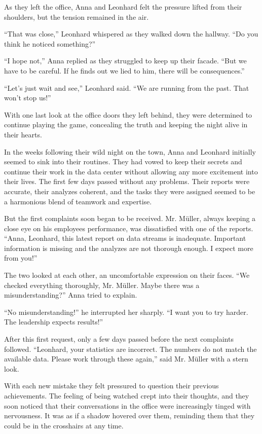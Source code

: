 \documentclass[
]{article}
\begin{document}
As they left the office, Anna and Leonhard felt the pressure lifted from
their shoulders, but the tension remained in the air.

``That was close,'' Leonhard whispered as they walked down the hallway.
``Do you think he noticed something?''

``I hope not,'' Anna replied as they struggled to keep up their facade.
``But we have to be careful. If he finds out we lied to him, there will
be consequences.''

``Let's just wait and see,'' Leonhard said. ``We are running from the
past. That won't stop us!''

With one last look at the office doors they left behind, they were
determined to continue playing the game, concealing the truth and
keeping the night alive in their hearts.

In the weeks following their wild night on the town, Anna and Leonhard
initially seemed to sink into their routines. They had vowed to keep
their secrets and continue their work in the data center without
allowing any more excitement into their lives. The first few days passed
without any problems. Their reports were accurate, their analyzes
coherent, and the tasks they were assigned seemed to be a harmonious
blend of teamwork and expertise.

But the first complaints soon began to be received. Mr. Müller, always
keeping a close eye on his employees\textquotesingle{} performance, was
dissatisfied with one of the reports. ``Anna, Leonhard, this latest
report on data streams is inadequate. Important information is missing
and the analyzes are not thorough enough. I expect more from you!''

The two looked at each other, an uncomfortable expression on their
faces. ``We checked everything thoroughly, Mr. Müller. Maybe there was a
misunderstanding?'' Anna tried to explain.

``No misunderstanding!'' he interrupted her sharply. ``I want you to try
harder. The leadership expects results!''

After this first request, only a few days passed before the next
complaints followed. ``Leonhard, your statistics are incorrect. The
numbers do not match the available data. Please work through these
again,'' said Mr. Müller with a stern look.

With each new mistake they felt pressured to question their previous
achievements. The feeling of being watched crept into their thoughts,
and they soon noticed that their conversations in the office were
increasingly tinged with nervousness. It was as if a shadow hovered over
them, reminding them that they could be in the crosshairs at any time.
\end{document}
